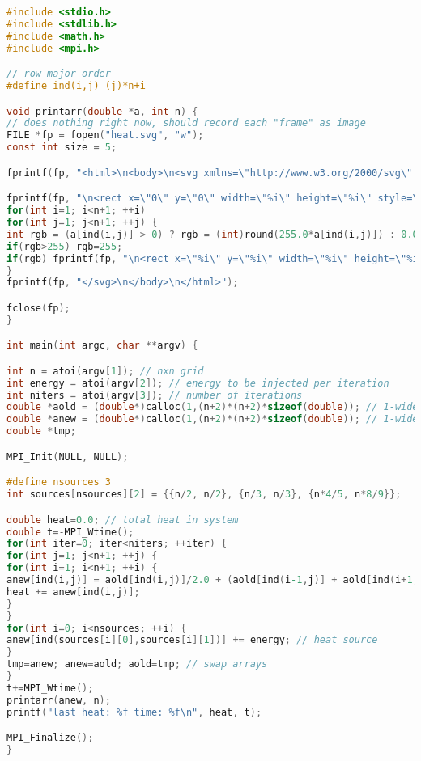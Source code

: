 \begin{lstlisting}[language=C, label={lst_stencseri}, caption={stencil.c.}]
#include <stdio.h>
#include <stdlib.h>
#include <math.h>
#include <mpi.h>

// row-major order
#define ind(i,j) (j)*n+i

void printarr(double *a, int n) {
// does nothing right now, should record each "frame" as image
FILE *fp = fopen("heat.svg", "w");
const int size = 5;

fprintf(fp, "<html>\n<body>\n<svg xmlns=\"http://www.w3.org/2000/svg\" version=\"1.1\">");

fprintf(fp, "\n<rect x=\"0\" y=\"0\" width=\"%i\" height=\"%i\" style=\"stroke-width:1;fill:rgb(0,0,0);stroke:rgb(0,0,0)\"/>", size*n, size*n);
for(int i=1; i<n+1; ++i)
for(int j=1; j<n+1; ++j) {
int rgb = (a[ind(i,j)] > 0) ? rgb = (int)round(255.0*a[ind(i,j)]) : 0.0;
if(rgb>255) rgb=255;
if(rgb) fprintf(fp, "\n<rect x=\"%i\" y=\"%i\" width=\"%i\" height=\"%i\" style=\"stroke-width:1;fill:rgb(%i,0,0);stroke:rgb(%i,0,0)\"/>", size*(i-1), size*(j-1), size, size, rgb, rgb);
}
fprintf(fp, "</svg>\n</body>\n</html>");

fclose(fp);
}

int main(int argc, char **argv) {

int n = atoi(argv[1]); // nxn grid
int energy = atoi(argv[2]); // energy to be injected per iteration
int niters = atoi(argv[3]); // number of iterations
double *aold = (double*)calloc(1,(n+2)*(n+2)*sizeof(double)); // 1-wide halo zones!
double *anew = (double*)calloc(1,(n+2)*(n+2)*sizeof(double)); // 1-wide halo-zones!
double *tmp;

MPI_Init(NULL, NULL);

#define nsources 3
int sources[nsources][2] = {{n/2, n/2}, {n/3, n/3}, {n*4/5, n*8/9}};

double heat=0.0; // total heat in system
double t=-MPI_Wtime();
for(int iter=0; iter<niters; ++iter) {
for(int j=1; j<n+1; ++j) {
for(int i=1; i<n+1; ++i) {
anew[ind(i,j)] = aold[ind(i,j)]/2.0 + (aold[ind(i-1,j)] + aold[ind(i+1,j)] + aold[ind(i,j-1)] + aold[ind(i,j+1)])/4.0/2.0;
heat += anew[ind(i,j)];
}
}
for(int i=0; i<nsources; ++i) {
anew[ind(sources[i][0],sources[i][1])] += energy; // heat source
}
tmp=anew; anew=aold; aold=tmp; // swap arrays
}
t+=MPI_Wtime();
printarr(anew, n);
printf("last heat: %f time: %f\n", heat, t);

MPI_Finalize();
}
\end{lstlisting}





